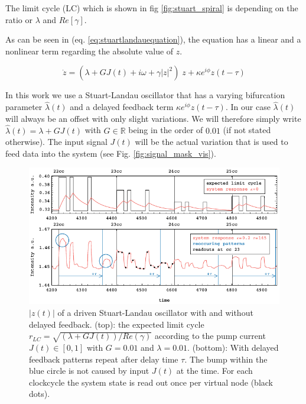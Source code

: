 The limit cycle (LC) which is shown in fig \ref{fig:stuart_spiral} is depending on the ratio or $\lambda$ and $Re \left[\gamma \right]$.


As can be seen in (eq. \ref{eq:stuartlandauequation}), the equation has a linear and a nonlinear term regarding the absolute value of $z$.

\begin{equation}	
\dot{z} = (\lambda + G J(t) + i \omega + \gamma |z|^2 ) \; z + \kappa e^{i \phi} z(t-\tau)
\label{eq:stuartlandauequation_delayed_driven}		
\end{equation}

In this work we use a Stuart-Landau oscillator that has a varying bifurcation parameter $\hat{\lambda}(t)$ and a delayed feedback term $\kappa e^{i\phi}z(t-\tau)$. In our case $\hat{\lambda}(t)$ will always be an offset with only slight variations. We will therefore simply write  $\hat{\lambda}(t) = \lambda + G J(t)$ with $G \in \mathbb{R}$ being in the order of $0.01$ (if not stated otherwise). The input signal $J(t)$ will be the actual variation that is used to feed data into the system (see Fig. \ref{fig:signal_mask_vis}). 

\begin{figure}
	\centering
	\includegraphics[width=15cm]{pics/driven_and_delayed}
	\caption{$|z(t)|$ of a driven Stuart-Landau oscillator with and without delayed feedback. (top): the expected limit cycle $r_{LC}=\sqrt{\left(\lambda+G J(t)\right)/Re(\gamma)}$ according to the pump current $J(t) \in [0,1]$ with $G=0.01$ and $\lambda=0.01$. (bottom): With delayed feedback patterns repeat after delay time $\tau$. The bump within the blue circle is not caused by input $J(t)$ at the time. For each clockcycle the system state is read out once per virtual node (black dots).}
	\label{fig:driven_and_delayed}
\end{figure}

